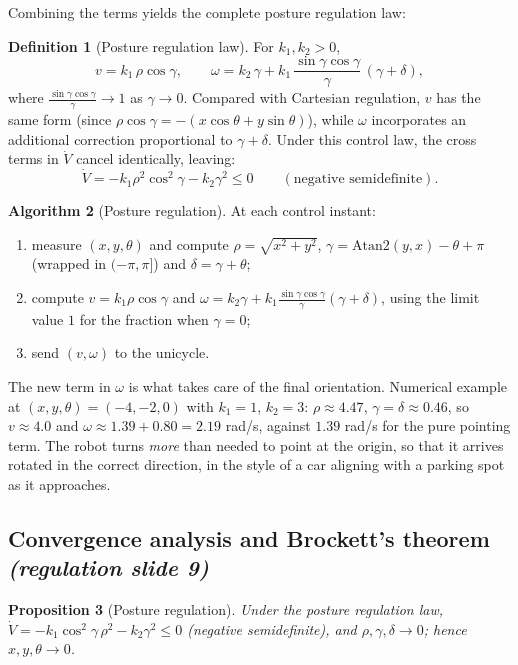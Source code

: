 \documentclass[11pt,a4paper]{article}
\theoremstyle{definition}
\newtheorem{definition}{Definition}[section]
\newtheorem{algorithm}[definition]{Algorithm}
\theoremstyle{plain}
\newtheorem{proposition}[definition]{Proposition}
\theoremstyle{remark}
\begin{document}
Combining the terms yields the complete posture regulation law:
\begin{definition}[Posture regulation law]
For $k_1,k_2>0$,
\[
v=k_1\,\rho\cos\gamma,\qquad
\omega=k_2\,\gamma+k_1\,\frac{\sin\gamma\cos\gamma}{\gamma}\,(\gamma+\delta),
\]
where $\frac{\sin\gamma\cos\gamma}{\gamma}\to1$ as $\gamma\to0$. Compared with Cartesian regulation, $v$ has the same form (since $\rho\cos\gamma = -(x\cos\theta+y\sin\theta)$), while $\omega$ incorporates an additional correction proportional to $\gamma+\delta$.
Under this control law, the cross terms in $\dot V$ cancel identically, leaving:
\[
\dot V = -k_1\rho^2\cos^2\gamma - k_2\gamma^2 \le 0\qquad (\text{negative semidefinite}).
\]
\end{definition}

\begin{algorithm}[Posture regulation]
At each control instant:
\begin{enumerate}[leftmargin=*,nosep]
\item measure $(x,y,\theta)$ and compute $\rho=\sqrt{x^2+y^2}$, $\gamma=\mathrm{Atan2}(y,x)-\theta+\pi$ (wrapped in $(-\pi,\pi]$) and $\delta=\gamma+\theta$;
\item compute $v=k_1\rho\cos\gamma$ and $\omega=k_2\gamma+k_1\frac{\sin\gamma\cos\gamma}{\gamma}(\gamma+\delta)$, using the limit value $1$ for the fraction when $\gamma=0$;
\item send $(v,\omega)$ to the unicycle.
\end{enumerate}
\end{algorithm}

\begin{intuition}
The new term in $\omega$ is what takes care of the final orientation. Numerical example at $(x,y,\theta)=(-4,-2,0)$ with $k_1=1$, $k_2=3$: $\rho\approx4.47$, $\gamma=\delta\approx0.46$, so $v\approx4.0$ and $\omega\approx1.39+0.80=2.19$ rad/s, against $1.39$ rad/s for the pure pointing term. The robot turns \emph{more} than needed to point at the origin, so that it arrives rotated in the correct direction, in the style of a car aligning with a parking spot as it approaches.
\end{intuition}

\subsection{Convergence analysis and Brockett's theorem \emph{(regulation slide 9)}}

\begin{proposition}[Posture regulation]\label{prop:post}
Under the posture regulation law, $\dot V=-k_1\cos^2\!\gamma\,\rho^2-k_2\gamma^2\le0$ (negative semidefinite), and $\rho,\gamma,\delta\to0$; hence $x,y,\theta\to0$.
\end{proposition}
\end{document}
